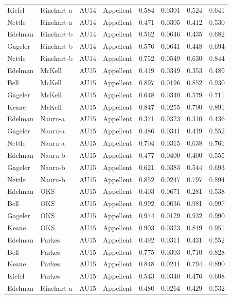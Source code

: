 \documentclass{monashthesis}
\begin{document}
\begin{center}
\begin{longtable}{llllllll}
Kiefel & Rinehart-a & AU14 & Appellent & 0.584 & 0.0301 & 0.524 & 0.641 \\
Nettle & Rinehart-a & AU14 & Appellent & 0.471 & 0.0305 & 0.412 & 0.530 \\
Edelman & Rinehart-b & AU14 & Appellent & 0.562 & 0.0646 & 0.435 & 0.682 \\
Gageler & Rinehart-b & AU14 & Appellent & 0.576 & 0.0641 & 0.448 & 0.694 \\
Nettle & Rinehart-b & AU14 & Appellent & 0.752 & 0.0549 & 0.630 & 0.844 \\
Edelman & McKell & AU15 & Appellent & 0.419 & 0.0349 & 0.353 & 0.489 \\
Bell & McKell & AU15 & Appellent & 0.897 & 0.0196 & 0.852 & 0.930 \\
Gageler & McKell & AU15 & Appellent & 0.648 & 0.0340 & 0.579 & 0.711 \\
Keane & McKell & AU15 & Appellent & 0.847 & 0.0255 & 0.790 & 0.891 \\
Edelman & Nauru-a & AU15 & Appellent & 0.371 & 0.0323 & 0.310 & 0.436 \\
Gageler & Nauru-a & AU15 & Appellent & 0.486 & 0.0341 & 0.419 & 0.552 \\
Nettle & Nauru-a & AU15 & Appellent & 0.704 & 0.0315 & 0.638 & 0.761 \\
Edelman & Nauru-b & AU15 & Appellent & 0.477 & 0.0400 & 0.400 & 0.555 \\
Gageler & Nauru-b & AU15 & Appellent & 0.621 & 0.0383 & 0.544 & 0.693 \\
Nettle & Nauru-b & AU15 & Appellent & 0.852 & 0.0247 & 0.797 & 0.894 \\
Edelman & OKS & AU15 & Appellent & 0.403 & 0.0671 & 0.281 & 0.538 \\
Bell & OKS & AU15 & Appellent & 0.992 & 0.0036 & 0.981 & 0.997 \\
Gageler & OKS & AU15 & Appellent & 0.974 & 0.0129 & 0.932 & 0.990 \\
Keane & OKS & AU15 & Appellent & 0.903 & 0.0323 & 0.819 & 0.951 \\
Edelman & Parkes & AU15 & Appellent & 0.492 & 0.0311 & 0.431 & 0.552 \\
Bell & Parkes & AU15 & Appellent & 0.775 & 0.0303 & 0.710 & 0.828 \\
Keane & Parkes & AU15 & Appellent & 0.848 & 0.0241 & 0.794 & 0.890 \\
Kiefel & Parkes & AU15 & Appellent & 0.543 & 0.0340 & 0.476 & 0.608 \\
Edelman & Rinehart-a & AU15 & Appellent & 0.480 & 0.0264 & 0.429 & 0.532 \\

\end{longtable}
\end{center}
\end{document}
